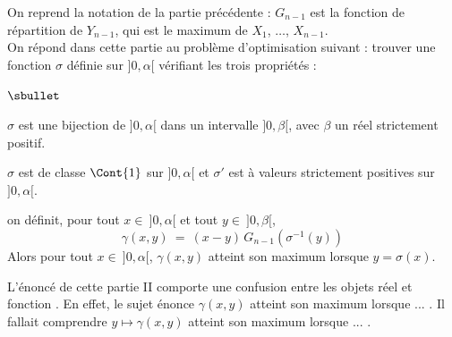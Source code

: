 \noindent
On reprend la notation de la partie précédente : $G_{n-1}$ est la
fonction de répartition de $Y_{n-1}$, qui est le maximum de $X_1$, 
$\ldots$, $X_{n-1}$.\\
On répond dans cette partie au problème d'optimisation suivant : 
trouver une fonction $\sigma$ définie sur $]0,\alpha[$ vérifiant les 
trois propriétés :
\begin{noliste}{$\sbullet$}
  \item $\sigma$ est une bijection de $]0,\alpha[$ dans un intervalle 
  $]0,\beta[$, avec $\beta$ un réel strictement positif.
  \item $\sigma$ est de classe $\Cont{1}$ sur $]0,\alpha[$ et 
  $\sigma'$ est à valeurs strictement positives sur $]0,\alpha[$.
  \item on définit, pour tout $x \in \ ]0,\alpha[$ et tout $y \in 
  \ ]0, \beta[$,
  \[
    \gamma(x,y) \ = \ (x-y) \, G_{n-1}(\sigma^{-1}(y))
  \]
  Alors pour tout $x \in \ ]0,\alpha[$, $\gamma(x,y)$ atteint son 
  maximum lorsque $y = \sigma(x)$.
\end{noliste}

\begin{remark}
  L'énoncé de cette partie II comporte une confusion entre les 
  objets \og réel \fg{} et \og fonction \fg{}. En effet, le sujet 
  énonce \og $\gamma(x,y)$ atteint son maximum lorsque ... \fg{}.
  Il fallait comprendre \og $y \mapsto \gamma(x,y)$ atteint son 
  maximum lorsque ... \fg{}.
\end{remark}


